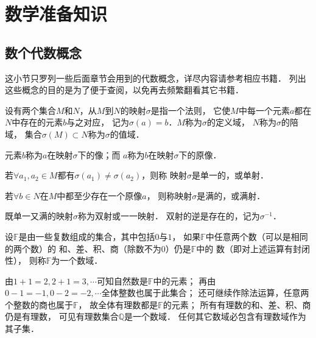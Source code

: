 
\chapter{数学准备知识}\label{chtop}



\section{数个代数概念}
这小节只罗列一些后面章节会用到的代数概念，详尽内容请参考相应书籍．
列出这些概念的目的是为了便于查阅，以免再去频繁翻看其它书籍．

\begin{definition}\label{chtop:def_map}
    设有两个集合$M$和$N$，从$M$到$N$的{\heiti 映射}$\sigma$是指一个法则，
    它使$M$中每一个元素$a$都在$N$中存在{}的元素$b$与之对应，
    记为$\sigma(a)=b$．$M$称为$\sigma$的{\heiti 定义域}，
    $N$称为$\sigma$的{\heiti 陪域}，
    集合$\sigma(M) \subset N$称为$\sigma$的{\heiti 值域}．
    
    元素$b$称为$a$在映射$\sigma$下的{\heiti 像}；而
    $a$称为$b$在映射$\sigma$下的{\heiti 原像}．
    
    若$\forall a_1,a_2 \in M$都有$\sigma(a_1) \neq \sigma(a_2)$，则称
    映射$\sigma$是单一的，或{\heiti 单射}．
    
    若$\forall b\in N$在$M$中都至少存在一个原像$a$，
    则称映射$\sigma$是满的，或{\heiti 满射}．
    
    既单一又满的映射$\sigma$称为{\heiti 双射}或{\heiti 一一映射}．
    双射的逆是存在的，记为$\sigma^{-1}$．
\end{definition}


\begin{definition}\label{chtop:def_number-field}
    设$\mathbb{F}$是由一些复数组成的集合，其中包括$0$与$1$，
    如果$\mathbb{F}$中任意两个数（可以是相同的两个数）的
    和、差、积、商（除数不为0）仍是$\mathbb{F}$中的
    数（即对上述运算有封闭性），
    则称$\mathbb{F}$为一个{\heiti 数域}．
\end{definition}
由$1+1=2,2+1=3,\cdots$可知自然数是$\mathbb{F}$中的元素；
再由$0-1=-1,0-2=-2,\cdots$全体整数也属于此集合；
还可继续作除法运算，任意两个整数的商也属于$\mathbb{F}$，
故全体有理数都是$\mathbb{F}$的元素；
所有有理数的和、差、积、商仍是有理数，
可见有理数集合$\mathbb{Q}$是一个数域．
任何其它数域必包含有理数域作为其子集．


